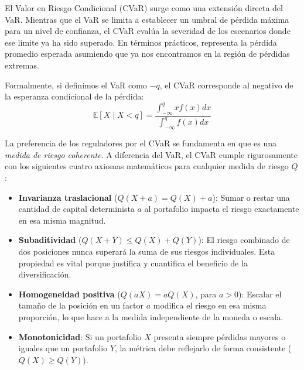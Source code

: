 El Valor en Riesgo Condicional (CVaR) surge como una extensión directa del VaR. Mientras que el VaR se limita a establecer un umbral de pérdida máxima para un nivel de confianza, el CVaR evalúa la severidad de los escenarios donde ese límite ya ha sido superado. En términos prácticos, representa la pérdida promedio esperada asumiendo que ya nos encontramos en la región de pérdidas extremas.

Formalmente, si definimos el VaR como $-q$, el CVaR corresponde al negativo de la esperanza condicional de la pérdida:
\begin{equation}
    \mathbb{E}[X \mid X < q] = \frac{\int_{-\infty}^{q} xf(x)dx}{\int_{-\infty}^{q} f(x)dx}
\end{equation}

La preferencia de los reguladores por el CVaR se fundamenta en que es una \textit{medida de riesgo coherente}. A diferencia del VaR, el CVaR cumple rigurosamente con los siguientes cuatro axiomas matemáticos para cualquier medida de riesgo $Q$:

\begin{itemize}
    \item \textbf{Invarianza traslacional} ($Q(X + a) = Q(X) + a$): Sumar o restar una cantidad de capital determinista $a$ al portafolio impacta el riesgo exactamente en esa misma magnitud.
    \item \textbf{Subaditividad} ($Q(X + Y) \leq Q(X) + Q(Y)$): El riesgo combinado de dos posiciones nunca superará la suma de sus riesgos individuales. Esta propiedad es vital porque justifica y cuantifica el beneficio de la diversificación.
    \item \textbf{Homogeneidad positiva} ($Q(aX) = aQ(X)$, para $a > 0$): Escalar el tamaño de la posición en un factor $a$ modifica el riesgo en esa misma proporción, lo que hace a la medida independiente de la moneda o escala.
    \item \textbf{Monotonicidad}: Si un portafolio $X$ presenta siempre pérdidas mayores o iguales que un portafolio $Y$, la métrica debe reflejarlo de forma consistente ($Q(X) \geq Q(Y)$).
\end{itemize}